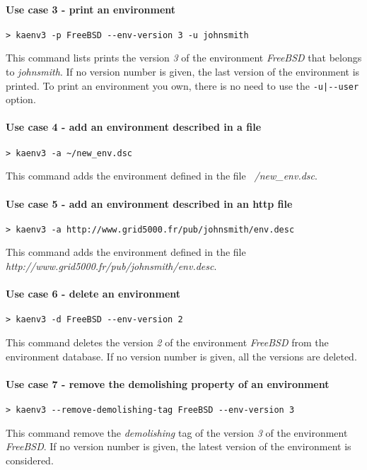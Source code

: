 \documentclass[a4wide,10pt,oneside]{book}
\begin{document}
\paragraph{Use case 3 - print an environment}
\begin{verbatim}
> kaenv3 -p FreeBSD --env-version 3 -u johnsmith
\end{verbatim}
This command lists prints the version \textit{3} of the environment \textit{FreeBSD} that belongs to \textit{johnsmith}. If no version number is given, the last version of the environment is printed. To print an environment you own, there is no need to use the \texttt{-u|-{}-user} option.

\paragraph{Use case 4 - add an environment described in a file}
\begin{verbatim}
> kaenv3 -a ~/new_env.dsc
\end{verbatim}
This command adds the environment defined in the file \textit{~/new\_env.dsc}.

\paragraph{Use case 5 - add an environment described in an http file}
\begin{verbatim}
> kaenv3 -a http://www.grid5000.fr/pub/johnsmith/env.desc
\end{verbatim}
This command adds the environment defined in the file \textit{http://www.grid5000.fr/pub/johnsmith/env.desc}.

\paragraph{Use case 6 - delete an environment}
\begin{verbatim}
> kaenv3 -d FreeBSD --env-version 2
\end{verbatim}
This command deletes the version \textit{2} of the environment \textit{FreeBSD} from the environment database. If no version number is given, all the versions are deleted.

\paragraph{Use case 7 - remove the demolishing property of an environment}
\begin{verbatim}
> kaenv3 --remove-demolishing-tag FreeBSD --env-version 3
\end{verbatim}
This command remove the \textit{demolishing} tag of the version \textit{3} of the environment \textit{FreeBSD}. If no version number is given, the latest version of the environment is considered.
\end{document}
